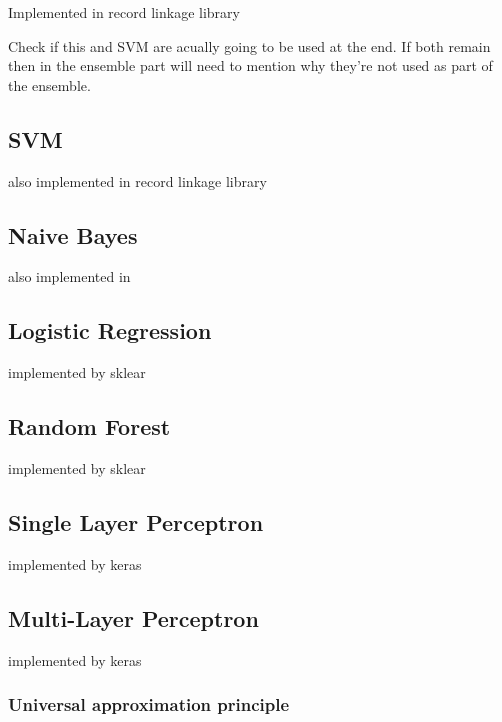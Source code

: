\documentclass[epsfig,a4paper,11pt,titlepage,twoside,openany]{book}
\begin{document}
Implemented in record linkage library \cite{recordlinkage-library}

Check if this and SVM are acually going to be used at the end. If both remain then in the ensemble part will need to mention why they're not used as part of the ensemble.

\subsection{SVM}
\label{sec:clf-svm}

also implemented in record linkage library \cite{recordlinkage-library} 


\subsection{Naive Bayes}
\label{sec:clf-nb}

also implemented in  \cite{recordlinkage-library}

\subsection{Logistic Regression}
\label{sec:clf-lr}

implemented by sklear \cite{scikit-learn}

\subsection{Random Forest}
\label{sec:clf-rgc}

implemented by sklear \cite{scikit-learn}

\subsection{Single Layer Perceptron}
\label{sec:clf-slp}

implemented by keras \cite{chollet2015keras}

\subsection{Multi-Layer Perceptron}
\label{sec:clf-mlp}

implemented by keras \cite{chollet2015keras}

\subsubsection{Universal approximation principle}
\label{sec:universal-apprx-principle}
\end{document}

